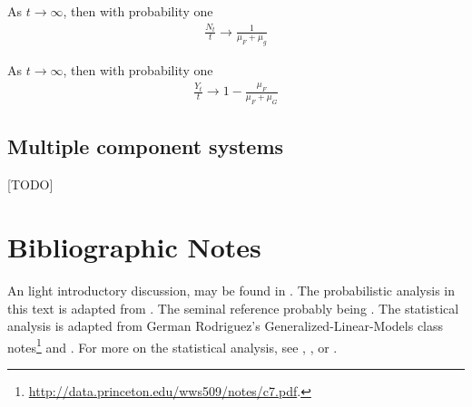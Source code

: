 \begin{theorem}

As $t \to \infty$, then with probability one
\begin{align}
	\frac{N_t}{t} \to \frac{1}{\mu_F+\mu_g}
\end{align}
\end{theorem}

\begin{theorem}
As $t \to \infty$, then with probability one
\begin{align}
	\frac{Y_t}{t} \to 1-\frac{\mu_F}{\mu_F+\mu_G} 
\end{align}
	
\end{theorem}










\subsection{Multiple component systems}
[TODO]



\section{Bibliographic Notes}
An light introductory discussion, may be found in \cite{nahmias_production_2015}. 
The probabilistic analysis in this text is adapted from \cite{aven_stochastic_1999}.
The seminal reference probably being \cite{barlow_mathematical_1965}.
The statistical analysis is adapted from German Rodriguez's Generalized-Linear-Models class notes\footnote{\url{http://data.princeton.edu/wws509/notes/c7.pdf}.} and \cite[Ch.8]{natrella_nist/sematech_2010}.
For more on the statistical analysis, see \cite{cox_analysis_1984}, \cite{kalbfleisch_statistical_2002}, or \cite{klein_survival_2005}.


% 